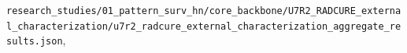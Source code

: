 \documentclass[pdflatex,sn-nature]{sn-jnl}
\begin{document}
{\footnotesize\texttt{r\allowbreak{}e\allowbreak{}s\allowbreak{}e\allowbreak{}a\allowbreak{}r\allowbreak{}c\allowbreak{}h\allowbreak{}\_\allowbreak{}s\allowbreak{}t\allowbreak{}u\allowbreak{}d\allowbreak{}i\allowbreak{}e\allowbreak{}s\allowbreak{}/\allowbreak{}0\allowbreak{}1\allowbreak{}\_\allowbreak{}p\allowbreak{}a\allowbreak{}t\allowbreak{}t\allowbreak{}e\allowbreak{}r\allowbreak{}n\allowbreak{}\_\allowbreak{}s\allowbreak{}u\allowbreak{}r\allowbreak{}v\allowbreak{}\_\allowbreak{}h\allowbreak{}n\allowbreak{}/\allowbreak{}c\allowbreak{}o\allowbreak{}r\allowbreak{}e\allowbreak{}\_\allowbreak{}b\allowbreak{}a\allowbreak{}c\allowbreak{}k\allowbreak{}b\allowbreak{}o\allowbreak{}n\allowbreak{}e\allowbreak{}/\allowbreak{}U\allowbreak{}7\allowbreak{}R\allowbreak{}2\allowbreak{}\_\allowbreak{}R\allowbreak{}A\allowbreak{}D\allowbreak{}C\allowbreak{}U\allowbreak{}R\allowbreak{}E\allowbreak{}\_\allowbreak{}e\allowbreak{}x\allowbreak{}t\allowbreak{}e\allowbreak{}r\allowbreak{}n\allowbreak{}a\allowbreak{}l\allowbreak{}\_\allowbreak{}c\allowbreak{}h\allowbreak{}a\allowbreak{}r\allowbreak{}a\allowbreak{}c\allowbreak{}t\allowbreak{}e\allowbreak{}r\allowbreak{}i\allowbreak{}z\allowbreak{}a\allowbreak{}t\allowbreak{}i\allowbreak{}o\allowbreak{}n\allowbreak{}/\allowbreak{}u\allowbreak{}7\allowbreak{}r\allowbreak{}2\allowbreak{}\_\allowbreak{}r\allowbreak{}a\allowbreak{}d\allowbreak{}c\allowbreak{}u\allowbreak{}r\allowbreak{}e\allowbreak{}\_\allowbreak{}e\allowbreak{}x\allowbreak{}t\allowbreak{}e\allowbreak{}r\allowbreak{}n\allowbreak{}a\allowbreak{}l\allowbreak{}\_\allowbreak{}c\allowbreak{}h\allowbreak{}a\allowbreak{}r\allowbreak{}a\allowbreak{}c\allowbreak{}t\allowbreak{}e\allowbreak{}r\allowbreak{}i\allowbreak{}z\allowbreak{}a\allowbreak{}t\allowbreak{}i\allowbreak{}o\allowbreak{}n\allowbreak{}\_\allowbreak{}a\allowbreak{}g\allowbreak{}g\allowbreak{}r\allowbreak{}e\allowbreak{}g\allowbreak{}a\allowbreak{}t\allowbreak{}e\allowbreak{}\_\allowbreak{}r\allowbreak{}e\allowbreak{}s\allowbreak{}u\allowbreak{}l\allowbreak{}t\allowbreak{}s\allowbreak{}.\allowbreak{}j\allowbreak{}s\allowbreak{}o\allowbreak{}n}}, 
\end{document}
